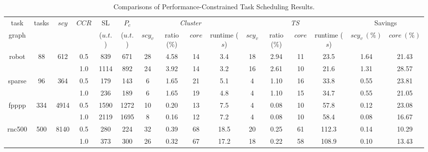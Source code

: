\documentclass[conference]{IEEEtran}
\begin{document}
\begin{table}[!t]
\renewcommand{\arraystretch}{1}
\caption{Comparisons of Performance-Constrained Task Scheduling Results.}
\centering
\begin{tabular}{c|c|c|c|c|c|c|c|c|c|c|c|c|c|c|c}
\hline
\hline
task            &\multicolumn{1}{c|}{\multirow{2}{*}{tasks}}     &\multicolumn{1}{c|}{\multirow{2}{*}{$scy$}}                     &\multicolumn{1}{c|}{\multirow{2}{*}{$CCR$}}     &SL    & $P_c$              &\multicolumn{4}{c|}{\textit{Cluster} \cite{article:CL}}          &\multicolumn{4}{c|}{\textit{TS}}  &\multicolumn{2}{c}{Savings}   \\ \cline{7-10} \cline{11-14} \cline{15-16}
graph          &   &    &   &($u.t.$)   &($u.t.$)    &\multicolumn{1}{c|}{\multirow{1}{*}{$scy_v$}} &ratio (\%)    &$core$ &runtime ($s$)   &$scy_v$       &ratio (\%)  &$core$        &runtime ($s$)  &$scy_v~(\%)$   &$core~(\%)$  \\

\hline
\hline

\multicolumn{1}{c|}{\multirow{2}{*}{robot}}   &\multicolumn{1}{c|}{\multirow{2}{*}{88}}   &\multicolumn{1}{c|}{\multirow{2}{*}{612}} &0.5 &839 &671 &28   &4.58   &14  &3.4  &18   &2.94   &11   &23.5     &1.64   &21.43 \\
                                              &      &                               &1.0  &1114  &892  &24 &3.92  &14  &3.2   &16  &2.61   &10   &21.6     &1.31   &28.57  \\
\hline

\multicolumn{1}{c|}{\multirow{2}{*}{sparse}}  &\multicolumn{1}{c|}{\multirow{2}{*}{96}}  &\multicolumn{1}{c|}{\multirow{2}{*}{364}}  &0.5 &179 &143 &6  &1.65  &21  &5.1   &4   &1.10   &16    &33.8    &0.55   &23.81 \\
&  &  &1.0 &236  &189  &6   &1.65   &19   &4.8  &4   &1.10  &15  &34.7   &0.55   &21.05 \\

\hline

\multicolumn{1}{c|}{\multirow{2}{*}{fpppp}} &\multicolumn{1}{c|}{\multirow{2}{*}{334}}    &\multicolumn{1}{c|}{\multirow{2}{*}{4914}}   &0.5 &1590  &1272  &10  &0.20 &13  &7.5  &4   &0.08   &10    &57.8    &0.12   &23.08  \\
& & &1.0 &2119  &1695  &8   &0.16   &12   &7.2  &4   &0.08  &10  &58.4   &0.08   &16.67  \\

\hline

\multicolumn{1}{c|}{\multirow{2}{*}{\hspace*{-0.5em}rnc500\hspace*{-0.5em}}}   &\multicolumn{1}{c|}{\multirow{2}{*}{500}}  &\multicolumn{1}{c|}{\multirow{2}{*}{8140}}   &0.5 &280  &224  &32   &0.39   &68  &18.5  &20  &0.25   &61   &112.3    & 0.14  &10.29 \\
&  &  &1.0 &373  &300  &26   &0.32   &67   &17.2  &18 &0.22  &58   &108.9  &0.10   &13.43    \\


\end{tabular}
\end{table}
\end{document}
